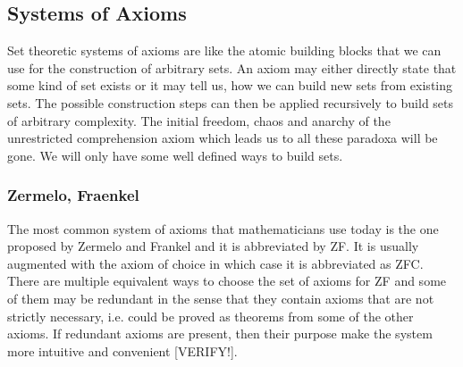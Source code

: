 




\subsection{Systems of Axioms}
Set theoretic systems of axioms are like the atomic building blocks that we can use for the construction of arbitrary sets. An axiom may either directly state that some kind of set exists or it may tell us, how we can build new sets from existing sets. The possible construction steps can then be applied recursively to build sets of arbitrary complexity. The initial freedom, chaos and anarchy of the unrestricted comprehension axiom which leads us to all these paradoxa will be gone. We will only have some well defined ways to build sets.

\subsubsection{Zermelo, Fraenkel}
The most common system of axioms that mathematicians use today is the one proposed by Zermelo and Frankel and it is abbreviated by ZF. It is usually augmented with the axiom of choice in which case it is abbreviated as ZFC. There are multiple equivalent ways to choose the set of axioms for ZF and some of them may be redundant in the sense that they contain axioms that are not strictly necessary, i.e. could be proved as theorems from some of the other axioms. If redundant axioms are present, then their purpose make the system more intuitive and convenient [VERIFY!].

